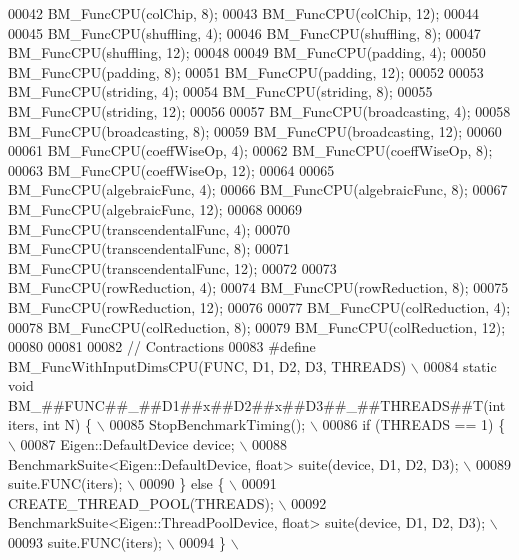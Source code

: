 \begin{DoxyCode}
00042 BM\_FuncCPU(colChip, 8);
00043 BM\_FuncCPU(colChip, 12);
00044 
00045 BM\_FuncCPU(shuffling, 4);
00046 BM\_FuncCPU(shuffling, 8);
00047 BM\_FuncCPU(shuffling, 12);
00048 
00049 BM\_FuncCPU(padding, 4);
00050 BM\_FuncCPU(padding, 8);
00051 BM\_FuncCPU(padding, 12);
00052 
00053 BM\_FuncCPU(striding, 4);
00054 BM\_FuncCPU(striding, 8);
00055 BM\_FuncCPU(striding, 12);
00056 
00057 BM\_FuncCPU(broadcasting, 4);
00058 BM\_FuncCPU(broadcasting, 8);
00059 BM\_FuncCPU(broadcasting, 12);
00060 
00061 BM\_FuncCPU(coeffWiseOp, 4);
00062 BM\_FuncCPU(coeffWiseOp, 8);
00063 BM\_FuncCPU(coeffWiseOp, 12);
00064 
00065 BM\_FuncCPU(algebraicFunc, 4);
00066 BM\_FuncCPU(algebraicFunc, 8);
00067 BM\_FuncCPU(algebraicFunc, 12);
00068 
00069 BM\_FuncCPU(transcendentalFunc, 4);
00070 BM\_FuncCPU(transcendentalFunc, 8);
00071 BM\_FuncCPU(transcendentalFunc, 12);
00072 
00073 BM\_FuncCPU(rowReduction, 4);
00074 BM\_FuncCPU(rowReduction, 8);
00075 BM\_FuncCPU(rowReduction, 12);
00076 
00077 BM\_FuncCPU(colReduction, 4);
00078 BM\_FuncCPU(colReduction, 8);
00079 BM\_FuncCPU(colReduction, 12);
00080 
00081 
00082 \textcolor{comment}{// Contractions}
00083 \textcolor{preprocessor}{#define BM\_FuncWithInputDimsCPU(FUNC, D1, D2, D3, THREADS)                      \(\backslash\)}
00084 \textcolor{preprocessor}{  static void BM\_##FUNC##\_##D1##x##D2##x##D3##\_##THREADS##T(int iters, int N) \{ \(\backslash\)}
00085 \textcolor{preprocessor}{    StopBenchmarkTiming();                                                      \(\backslash\)}
00086 \textcolor{preprocessor}{    if (THREADS == 1) \{                                                         \(\backslash\)}
00087 \textcolor{preprocessor}{      Eigen::DefaultDevice device;                                              \(\backslash\)}
00088 \textcolor{preprocessor}{      BenchmarkSuite<Eigen::DefaultDevice, float> suite(device, D1, D2, D3);    \(\backslash\)}
00089 \textcolor{preprocessor}{      suite.FUNC(iters);                                                        \(\backslash\)}
00090 \textcolor{preprocessor}{    \} else \{                                                                    \(\backslash\)}
00091 \textcolor{preprocessor}{      CREATE\_THREAD\_POOL(THREADS);                                              \(\backslash\)}
00092 \textcolor{preprocessor}{      BenchmarkSuite<Eigen::ThreadPoolDevice, float> suite(device, D1, D2, D3); \(\backslash\)}
00093 \textcolor{preprocessor}{      suite.FUNC(iters);                                                        \(\backslash\)}
00094 \textcolor{preprocessor}{    \}                                                                           \(\backslash\)}

\end{DoxyCode}
